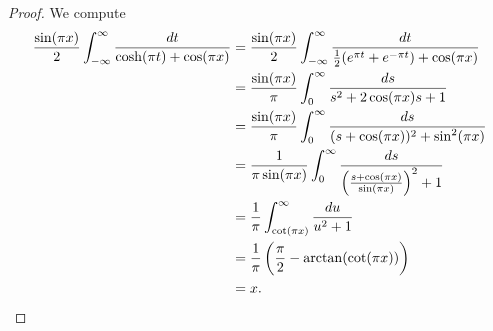 \begin{proof}
	We compute
	\begin{align*}
		\frac{\sin( \pi x )}{2} \int_{-\infty}^\infty \frac{dt}{\cosh(\pi t ) + \cos( \pi x )} &= \frac{\sin( \pi x )}{2} \int_{-\infty}^\infty \frac{dt}{\frac{1}{2}( e^{\pi t} + e^{-\pi t} ) + \cos( \pi x )}\\
		&= \frac{\sin( \pi x )}{\pi} \int_{0}^\infty \frac{ds}{s^2 + 2\cos( \pi x )s + 1}\\
		&= \frac{\sin( \pi x )}{\pi} \int_{0}^\infty \frac{ds}{( s + \cos( \pi x ) )^2 + \sin^2( \pi x )}\\
		&= \frac{1}{\pi\sin( \pi x )} \int_{0}^\infty \frac{ds}{\del{ \frac{s + \cos( \pi x )}{\sin( \pi x )}}^2 + 1}\\
		&= \frac{1}{\pi} \int_{\cot( \pi x )}^\infty \frac{du}{u^2 + 1}\\
		&= \frac{1}{\pi}\del[3]{ \frac{\pi}{2} - \arctan( \cot( \pi x )) }\\
		&= x.
\end{align*}
\end{proof}


